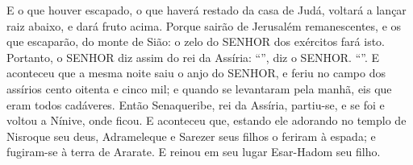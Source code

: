 {{{{{{  E o que houver escapado, o que haverá restado da casa de Judá, voltará a lançar raiz abaixo, e dará fruto acima.
  Porque sairão de Jerusalém remanescentes, e os que escaparão, do monte de Sião: o zelo do SENHOR dos exércitos fará isto}}.
  Portanto, o SENHOR diz assim do rei da Assíria: \enquote{}, diz o SENHOR.
  \enquote{}}}}.
  E aconteceu que a mesma noite saiu o anjo do SENHOR, e feriu no campo dos assírios cento oitenta e cinco mil; e quando se levantaram pela manhã, eis que eram todos cadáveres.
  Então Senaqueribe, rei da Assíria, partiu-se, e se foi e voltou a Nínive, onde ficou.
  E aconteceu que, estando ele adorando no templo de Nisroque seu deus, Adrameleque e Sarezer seus filhos o feriram à espada; e fugiram-se à terra de Ararate. E reinou em seu lugar Esar-Hadom seu filho.
\par }

